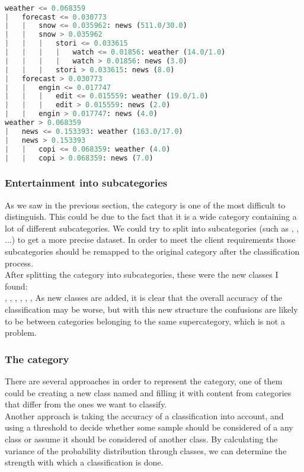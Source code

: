 \begin{lstlisting}[language=Python]

weather <= 0.068359
|   forecast <= 0.030773
|   |   snow <= 0.035962: news (511.0/30.0)
|   |   snow > 0.035962
|   |   |   stori <= 0.033615
|   |   |   |   watch <= 0.01856: weather (14.0/1.0)
|   |   |   |   watch > 0.01856: news (3.0)
|   |   |   stori > 0.033615: news (8.0)
|   forecast > 0.030773
|   |   engin <= 0.017747
|   |   |   edit <= 0.015559: weather (19.0/1.0)
|   |   |   edit > 0.015559: news (2.0)
|   |   engin > 0.017747: news (4.0)
weather > 0.068359
|   news <= 0.153393: weather (163.0/17.0)
|   news > 0.153393
|   |   copi <= 0.068359: weather (4.0)
|   |   copi > 0.068359: news (7.0)
\end{lstlisting}

\subsubsection{Entertainment into subcategories}
As we saw in the previous section, the category  is one of the most difficult to distinguish. This could be due to the fact that it is a wide category containing a lot of different
subcategories. We could try to split  into subcategories (such as , , ...) to get a more precise dataset. In order to meet the
client requirements those subcategories should be remapped to the original  category after the classification process. \\
After splitting the  category into subcategories, these were the new classes I found: \\
, , , , , ,  
As new classes are added, it is clear that the overall accuracy of the classification may be worse, but with this new structure the confusions are likely to be between categories belonging to the same
supercategory, which is not a problem.
 

\subsubsection{The  category}
There are several approaches in order to represent the  category, one of them could be creating a new class named  and filling it with content from categories that 
differ from the ones we want to classify.\\
Another approach is taking the accuracy of a classification into account, and using a threshold to decide whether some sample should be considered of a any class or assume it should be considered of 
another class. 
By calculating the variance of the probability distribution through classes, we can determine the strength with which a classification is done.   


